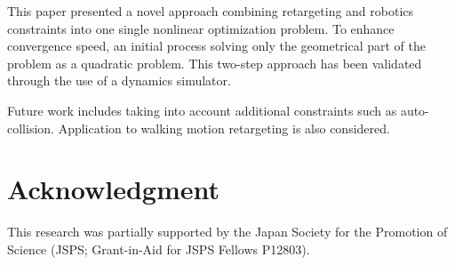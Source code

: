 \documentclass[letterpaper, 10 pt, conference]{ieeeconf}  %
\begin{document}
This paper presented a novel approach combining retargeting and
robotics constraints into one single nonlinear optimization
problem. To enhance convergence speed, an initial process solving only
the geometrical part of the problem as a quadratic problem. This
two-step approach has been validated through the use of a dynamics
simulator.

Future work includes taking into account additional constraints such
as auto-collision. Application to walking motion retargeting is also
considered.








%
%
\section*{Acknowledgment}

This research was partially supported by the Japan Society for the
Promotion of Science (JSPS; Grant-in-Aid for JSPS Fellows P12803).





\end{document}
